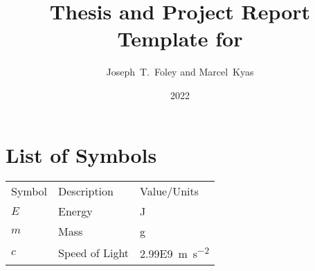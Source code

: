 \documentclass[showtrims]{rubook}
\title{Thesis and Project Report Template for \theInstitution{}}
\author{Joseph~T.~Foley and Marcel~Kyas}
\date{2022}{5}{5}%
\begin{document}
\maketitle{}
\copyrightpage{}


\enableindents{}%

\clearpage{}
\tableofcontents{}\clearpage
\listoffigures{}\clearpage
\listoftables{}\clearpage

\chapter*{List of Symbols}%
\begin{tabular}{lll}
Symbol &Description &Value/Units\\
$E$ &Energy &\si{\joule}\\ %
$m$ &Mass &\si{\gram}\\ %
$c$ &Speed of Light &\SI{2.99E9}{\meter\per\square\second}\\ %
\end{tabular}
\end{document}
